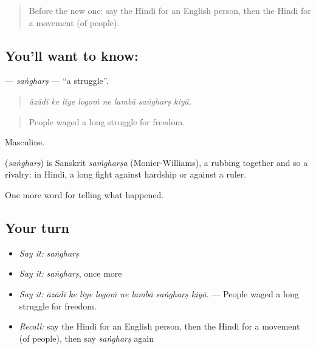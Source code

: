 \label{lesson:HI-C325-sanghars}



\begin{quote}
Before the new one: say the Hindi for an English person, then the Hindi for a movement (of people).
\end{quote}

\subsection*{You'll want to know: }
\textbf{} — \emph{saṅgharṣ} — \textquotedblleft{}a struggle\textquotedblright{}.

\begin{quote}
       
\end{quote}

\begin{quote}
\emph{āzādī ke liye logoṁ ne lambā saṅgharṣ kiyā.}
\end{quote}

\begin{quote}
People waged a long struggle for freedom.
\end{quote}

Masculine.

\begin{cousinweb}
\textbf{} (\emph{saṅgharṣ}) is Sanskrit \emph{saṁgharṣa} (Monier-Williams), a rubbing together and so a rivalry: in Hindi, a long fight against hardship or against a ruler.
\end{cousinweb}

\begin{grammarlens}[title={What you've built}]
One more word for telling what happened.
\end{grammarlens}

\subsection*{Your turn}
\begin{itemize}
\raggedright
  \item \emph{Say it:} \emph{saṅgharṣ}
  \item \emph{Say it:} \emph{saṅgharṣ}, once more
  \item \emph{Say it:} \emph{āzādī ke liye logoṁ ne lambā saṅgharṣ kiyā.} — People waged a long struggle for freedom.
  \item \emph{Recall:} say the Hindi for an English person, then the Hindi for a movement (of people), then say \emph{saṅgharṣ} again
\end{itemize}

